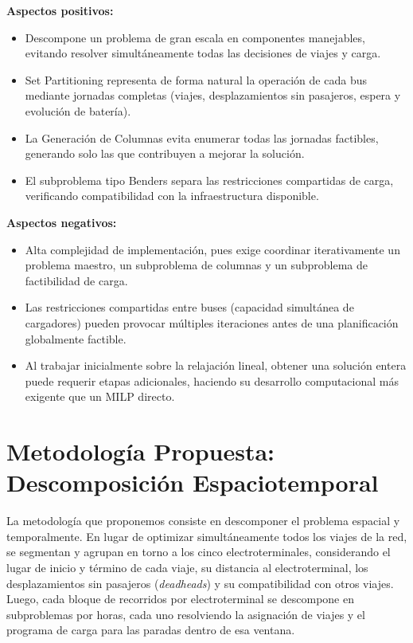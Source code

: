\textbf{Aspectos positivos:}
\begin{itemize}
\setlength{\itemsep}{1pt}
\item Descompone un problema de gran escala en componentes manejables, evitando resolver simult\'aneamente todas las decisiones de viajes y carga.
\item Set Partitioning representa de forma natural la operaci\'on de cada bus mediante jornadas completas (viajes, desplazamientos sin pasajeros, espera y evoluci\'on de bater\'ia).
\item La Generaci\'on de Columnas evita enumerar todas las jornadas factibles, generando solo las que contribuyen a mejorar la soluci\'on.
\item El subproblema tipo Benders separa las restricciones compartidas de carga, verificando compatibilidad con la infraestructura disponible.
\end{itemize}

\textbf{Aspectos negativos:}
\begin{itemize}
\setlength{\itemsep}{1pt}
\item Alta complejidad de implementaci\'on, pues exige coordinar iterativamente un problema maestro, un subproblema de columnas y un subproblema de factibilidad de carga.
\item Las restricciones compartidas entre buses (capacidad simult\'anea de cargadores) pueden provocar m\'ultiples iteraciones antes de una planificaci\'on globalmente factible.
\item Al trabajar inicialmente sobre la relajaci\'on lineal, obtener una soluci\'on entera puede requerir etapas adicionales, haciendo su desarrollo computacional m\'as exigente que un MILP directo.
\end{itemize}

\section{Metodolog\'ia Propuesta: Descomposici\'on Espaciotemporal \label{sec:metodologiapropuesta}}

La metodolog\'ia que proponemos consiste en descomponer el problema espacial y temporalmente. En lugar de optimizar simult\'aneamente todos los viajes de la red, se segmentan y agrupan en torno a los cinco electroterminales, considerando el lugar de inicio y t\'ermino de cada viaje, su distancia al electroterminal, los desplazamientos sin pasajeros (\emph{deadheads}) y su compatibilidad con otros viajes. Luego, cada bloque de recorridos por electroterminal se descompone en subproblemas por horas, cada uno resolviendo la asignaci\'on de viajes y el programa de carga para las paradas dentro de esa ventana.

